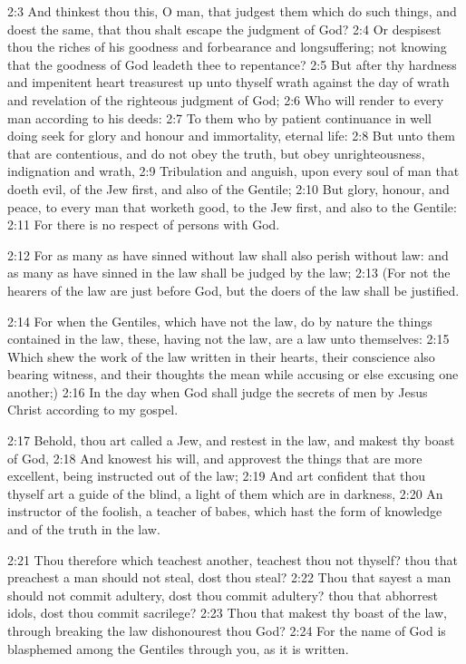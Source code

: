 2:3 And thinkest thou this, O man, that judgest them which do such
things, and doest the same, that thou shalt escape the judgment of
God?  2:4 Or despisest thou the riches of his goodness and forbearance
and longsuffering; not knowing that the goodness of God leadeth thee
to repentance?  2:5 But after thy hardness and impenitent heart
treasurest up unto thyself wrath against the day of wrath and
revelation of the righteous judgment of God; 2:6 Who will render to
every man according to his deeds: 2:7 To them who by patient
continuance in well doing seek for glory and honour and immortality,
eternal life: 2:8 But unto them that are contentious, and do not obey
the truth, but obey unrighteousness, indignation and wrath, 2:9
Tribulation and anguish, upon every soul of man that doeth evil, of
the Jew first, and also of the Gentile; 2:10 But glory, honour, and
peace, to every man that worketh good, to the Jew first, and also to
the Gentile: 2:11 For there is no respect of persons with God.

2:12 For as many as have sinned without law shall also perish without
law: and as many as have sinned in the law shall be judged by the law;
2:13 (For not the hearers of the law are just before God, but the
doers of the law shall be justified.

2:14 For when the Gentiles, which have not the law, do by nature the
things contained in the law, these, having not the law, are a law unto
themselves: 2:15 Which shew the work of the law written in their
hearts, their conscience also bearing witness, and their thoughts the
mean while accusing or else excusing one another;) 2:16 In the day
when God shall judge the secrets of men by Jesus Christ according to
my gospel.

2:17 Behold, thou art called a Jew, and restest in the law, and makest
thy boast of God, 2:18 And knowest his will, and approvest the things
that are more excellent, being instructed out of the law; 2:19 And art
confident that thou thyself art a guide of the blind, a light of them
which are in darkness, 2:20 An instructor of the foolish, a teacher of
babes, which hast the form of knowledge and of the truth in the law.

2:21 Thou therefore which teachest another, teachest thou not thyself?
thou that preachest a man should not steal, dost thou steal?  2:22
Thou that sayest a man should not commit adultery, dost thou commit
adultery? thou that abhorrest idols, dost thou commit sacrilege?  2:23
Thou that makest thy boast of the law, through breaking the law
dishonourest thou God?  2:24 For the name of God is blasphemed among
the Gentiles through you, as it is written.

